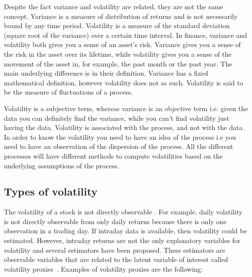 Despite the fact variance and volatility are related, they are not the same concept. Variance is a measure of distribution of returns and is not necessarily
bound by any time period.  Volatility is a measure of the standard deviation
(square root of the variance) over a certain time interval. In finance,
variance and volatility both gives you a sense of an asset's risk. Variance
gives you a sense of the risk in the asset over its lifetime, while volatility
gives you a sense of the movement of the asset in, for example, the past month or the
past year. The main underlying difference is in their definition. Variance has a
fixed mathematical definition, however volatility does not as such. Volatility
is said to be the measure of fluctuations of a process.

Volatility is a subjective term, whereas variance is an objective term i.e.
given the data you can definitely find the variance, while you can't find
volatility just having the data. Volatility is associated with the process, and
not with the data. In order to know the volatility you need to have an idea of the process i.e you
need to have an observation of the dispersion of the process. All the different
processes will have different methods to compute volatilities based on the
underlying assumptions of the process.  

\subsection{Types of volatility}

The volatility of a stock is not directly observable \cite{tsay2005,engle1993}. For example, daily volatility is not directly observable from only daily returns because there is only one observation in a trading day.  If intraday data is available, then volatility could be estimated. However, intraday returns are not the only explanatory variables for volatility and several estimators have been proposed. These estimators are observable variables that are related to the latent variable of interest called volatility proxies~\cite{devilderetal2007}. Examples of volatility proxies are the following: 



